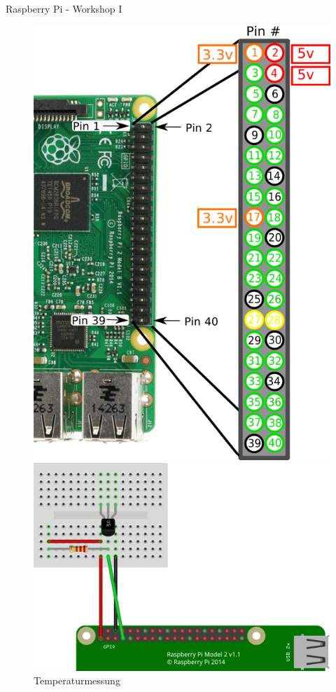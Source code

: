 \documentclass{\VorlagenPfad/coderdojokatext}
\renewcommand{\Titel}{Raspberry Pi - Workshop I}
\begin{document}
\begin{center}
	{\huge \Titel}
\end{center}

\begin{figure}[htb]
	\centering
	\begin{minipage}[t]{0.45\linewidth}
		\centering
		\includegraphics[width=.9\textwidth]{pin_layout.png}
		\caption{Raspberry Pi Pin-Übersicht}
	\end{minipage}%
	\hfill
	\begin{minipage}[t]{0.45\linewidth}
		\centering
		\includegraphics[width=.9\textwidth]{temperatur/temperatur.png}
		\caption{Temperaturmessung}
	\end{minipage}
\end{figure}
\end{document}
